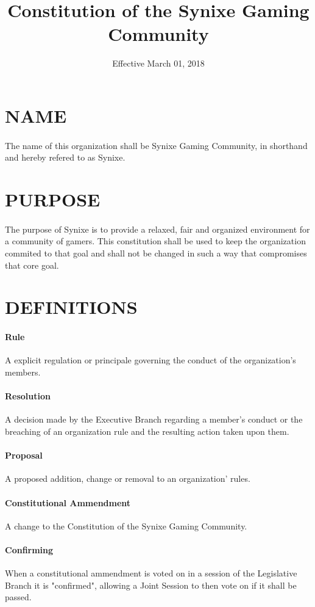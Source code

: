 \documentclass[10pt,a4paper]{article}
\title{Constitution of the Synixe Gaming Community}
\date{Effective March 01, 2018}
\begin{document}
\maketitle
\newpage
\section{NAME}
\paragraph{}
The name of this organization shall be Synixe Gaming Community, in shorthand and hereby refered to as Synixe.
\section{PURPOSE}
\paragraph{}
The purpose of Synixe is to provide a relaxed, fair and organized environment for a community of gamers. This constitution shall be used to keep the organization commited to that goal and shall not be changed in such a way that compromises that core goal.
\section{DEFINITIONS}
\paragraph{Rule} A explicit regulation or principale governing the conduct of the organization's members.
\paragraph{Resolution} A decision made by the Executive Branch regarding a member's conduct or the breaching of an organization rule and the resulting action taken upon them.
\paragraph{Proposal} A proposed addition, change or removal to an organization' rules.
\paragraph{Constitutional Ammendment} A change to the Constitution of the Synixe Gaming Community.
\paragraph{Confirming} When a constitutional ammendment is voted on in a session of the Legislative Branch it is "confirmed", allowing a Joint Session to then vote on if it shall be passed.
\end{document}
